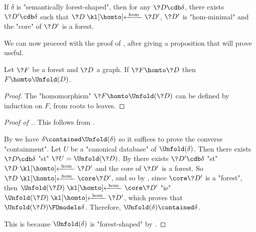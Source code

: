 \begin{corollary}
	\AP\label{coro:all-cdb-are-dominated-by-forests}
	If $\delta$ is "semantically forest-shaped", then for any
	$\?D \cdb \delta$, there exists $\?D' \cdb \delta$ such that
	$\?D \cohomto \?D'$, $\?D'$ is "hom-minimal" and the "core" of $\?D'$ is a forest.
\end{corollary}

We can now proceed with the proof of , after giving a
proposition that will prove useful.

\begin{proposition}
	\AP\label{prop:hom-from-forest}
	Let $\?F$ be a forest and $\?D$ a graph. If $\?F \homto \?D$ then $F \homto \Unfold(D)$.
\end{proposition}

\begin{proof}
	The "homomorphism" $\?F \homto \Unfold(\?D)$ can be defined by induction on $F$, from roots
	to leaves.
\end{proof}

\begin{proof}[Proof of .]
	 This follows from
	.

	 By  we have $\delta \contained \Unfold(\delta)$ so it suffices to prove the converse "containment".
	Let $U$ be a "canonical database" of $\Unfold(\delta)$. Then there exists $\?D \cdb \delta$
	"st" $\?U = \Unfold(\?D)$. By  there exists
	$\?D' \cdb \delta$ "st" $\?D \cohomto \?D'$ and the core of $\?D'$ is a forest. So $\?D \cohomto \core\?D'$, and so by , since $\core\?D'$ is a "forest",
	then $\Unfold(\?D) \cohomto \core\?D'$ "ie" $\Unfold(\?D) \cohomto \?D'$, which proves
	that $\Unfold(\?D) \FOmodels \delta$. Therefore, $\Unfold(\delta) \contained \delta$.

	 This is because $\Unfold(\delta)$ is "forest-shaped"
		by .
\end{proof}